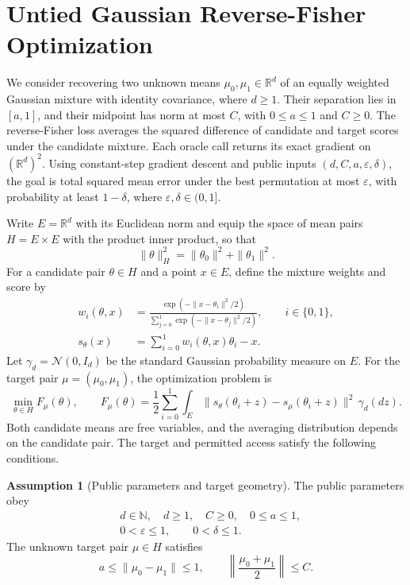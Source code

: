 \documentclass[10pt]{article}
\theoremstyle{definition}
\newtheorem{assumption}{Assumption}
\begin{document}
\section*{Untied Gaussian Reverse-Fisher Optimization}
We consider recovering two unknown means $\mu_0,\mu_1\in\mathbb{R}^d$ of an equally weighted Gaussian mixture with identity covariance, where $d\geq1$. Their separation lies in $[a,1]$, and their midpoint has norm at most $C$, with $0\leq a\leq1$ and $C\geq0$. The reverse-Fisher loss averages the squared difference of candidate and target scores under the candidate mixture. Each oracle call returns its exact gradient on $(\mathbb{R}^d)^2$. Using constant-step gradient descent and public inputs $(d,C,a,\varepsilon,\delta)$, the goal is total squared mean error under the best permutation at most $\varepsilon$, with probability at least $1-\delta$, where $\varepsilon,\delta\in(0,1]$.

Write $E=\mathbb{R}^d$ with its Euclidean norm and equip the space of mean pairs $H=E\times E$ with the product inner product, so that
\[
\|\theta\|_H^2=\|\theta_0\|^2+\|\theta_1\|^2.
\]
For a candidate pair $\theta\in H$ and a point $x\in E$, define the mixture weights and score by
\[
\begin{aligned}
w_i(\theta,x)
&=\frac{\exp(-\|x-\theta_i\|^2/2)}
{\sum_{j=0}^1\exp(-\|x-\theta_j\|^2/2)},
\qquad i\in\{0,1\},\\
s_\theta(x)&=\sum_{i=0}^1 w_i(\theta,x)\theta_i-x.
\end{aligned}
\]
Let $\gamma_d=\mathcal{N}(0,I_d)$ be the standard Gaussian probability measure on $E$. For the target pair $\mu=(\mu_0,\mu_1)$, the optimization problem is
\[
\min_{\theta\in H} F_\mu(\theta),
\qquad
F_\mu(\theta)=\frac12\sum_{i=0}^1
\int_E \|s_\theta(\theta_i+z)-s_\mu(\theta_i+z)\|^2
\,\gamma_d(dz).
\]
Both candidate means are free variables, and the averaging distribution depends on the candidate pair. The target and permitted access satisfy the following conditions.

\begin{assumption}[Public parameters and target geometry]
The public parameters obey
\[
\begin{aligned}
&d\in\mathbb{N},\quad d\geq1,\quad C\geq0,\quad 0\leq a\leq1,\\
&0<\varepsilon\leq1,\qquad 0<\delta\leq1.
\end{aligned}
\]
The unknown target pair $\mu\in H$ satisfies
\[
a\leq\|\mu_0-\mu_1\|\leq1,
\qquad
\left\|\frac{\mu_0+\mu_1}{2}\right\|\leq C.
\]
\end{assumption}
\end{document}
